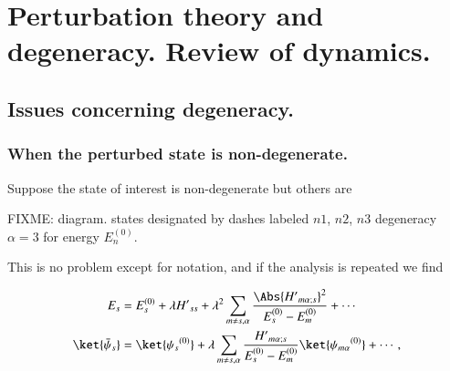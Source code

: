 %
%

\chapter{Perturbation theory and degeneracy.  Review of dynamics.}
\label{chap:qmTwoL5}
{}
\date{Sept 23, 2011}

\beginArtWithToc

%

\section{Issues concerning degeneracy.}

\subsection{When the perturbed state is non-degenerate.}

Suppose the state of interest is non-degenerate but others are

FIXME: diagram.  states designated by dashes labeled $n1$, $n2$, $n3$ degeneracy $\alpha = 3$ for energy $E_n^{(0)}$.

This is no problem except for notation, and if the analysis is repeated we find

\begin{align}\label{eqn:qmTwoL5:10}
E_s &= E_s^{(0)} + \lambda {H'}_{ss} + \lambda^2 
\sum_{m \ne s, \alpha} 
\frac{\Abs{{H'}_{m \alpha ; s}}^2 }
{ E_s^{(0)} - E_m^{(0)} } 
+ \cdots
\\
\ket{\bar{\psi}_s} &= \ket{{\psi_s}^{(0)}} + \lambda
\sum_{m \ne s, \alpha} 
\frac{{H'}_{m \alpha ; s}}
{ E_s^{(0)} - E_m^{(0)} } \ket{{\psi_{m \alpha}}^{(0)}}
+ \cdots,
\end{align}

